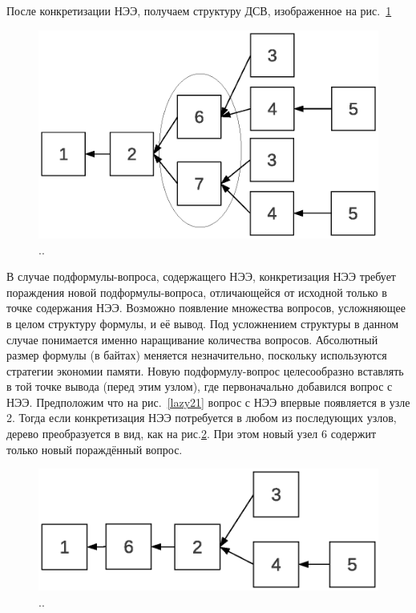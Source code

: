 После конкретизации НЭЭ, получаем структуру ДСВ, изображенное на рис.~\ref{lazy22}

\begin{figure}[h]
	\centering
	\includegraphics[width=0.5\linewidth]{pics/Lazy22.eps}
	\caption{..}
	\label{lazy22}
\end{figure}

В случае подформулы-вопроса, содержащего НЭЭ, конкретизация НЭЭ требует пораждения новой подформулы-вопроса, отличающейся от исходной только в точке содержания НЭЭ. Возможно появление множества вопросов, усложняющее в целом структуру формулы, и её вывод. Под усложнением структуры в данном случае понимается именно наращивание количества вопросов. Абсолютный размер формулы (в байтах) меняется незначительно, поскольку используются стратегии экономии памяти. Новую подформулу-вопрос целесообразно вставлять в той точке вывода (перед этим узлом), где первоначально добавился вопрос с НЭЭ. Предположим что на рис.~\ref{lazy21} вопрос с НЭЭ впервые появляется в узле 2. Тогда если конкретизация НЭЭ потребуется в любом из последующих узлов, дерево преобразуется в вид, как на рис.\ref{lazy23}. При этом новый узел 6 содержит только новый пораждённый вопрос.

\begin{figure}[h]
	\centering
	\includegraphics[width=0.5\linewidth]{pics/Lazy23.eps}
	\caption{..}
	\label{lazy23}
\end{figure}


